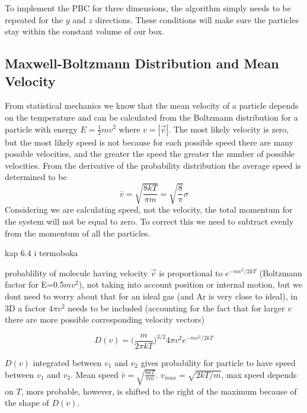 \documentclass{article}
\begin{document}
\begin{algorithm}[h]
\end{algorithm}
To implement the PBC for three dimensions, the algorithm simply needs to be repeated for the $y$ and $z$ directions. These conditions will make sure the particles stay within the constant volume of our box.


\subsection{Maxwell-Boltzmann Distribution and Mean Velocity}
From statistical mechanics we know that the mean velocity of a particle depends on the temperature and can be calculated from the Boltzmann distribution for a particle with energy $E=\frac{1}{2}mv^2$ where $v=|\vec{v}|$. The most likely velocity is zero, but the most likely speed is not because for each possible speed there are many possible velocities, and the greater the speed the greater the number of possible velocities. From the derivative of the probability distribution the average speed is determined to be
$$\bar{v}=\sqrt{\frac{8kT}{\pi m}}=\sqrt{\frac{8}{\pi}}\sigma$$
Considering we are calculating speed, not the velocity,  the total momentum for the system will not be equal to zero. To correct this we need to subtract evenly from the momentum of all the particles.

kap 6.4 i termoboka \cite{termoboka}

probablility of molecule having velocity $\vec{v}$ is proportional to $e^{-mv^2/2kT}$ (Boltzmann factor for E=0.5$mv^2$), not taking into account position or internal motion, but we dont need to worry about that for an ideal gas (and Ar is very close to ideal), in 3D a factor $4\pi v^2$ needs to be included (accounting for the fact that for larger $v$ there are more possible corresponding velocity vectors)

$$D(v)=\bigg(\frac{m}{2\pi kT}\bigg)^{3/2}4\pi v^2 e^{-mv^2/2kT}$$

$D(v)$ integrated between $v_1$ and $v_2$ gives probability for particle to have speed between $v_1$ and $v_2$. Mean speed $\bar{v}=\sqrt{\frac{8kT}{\pi m}}$. $v_{max}=\sqrt{2kT/m}$, max speed depends on $T$, mors probable, however, is shifted to the right of the maximum because of the shape of $D(v)$.
\end{document}

